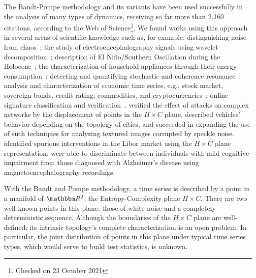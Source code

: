\documentclass[alpha-refs]{wiley-article}
\begin{document}
The Bandt-Pompe methodology and its variants have been used successfully in the analysis of many types of dynamics, receiving so far more than \num{2,160} citations, according to the Web of Science\footnote{Checked on 23 October 2021}.
We found works using this approach in several areas of scientific knowledge such as, for example:
%
distinguishing noise from chaos~\citep{rosso2007distinguishing};
%
the study of electroencephalography signals using wavelet decomposition~\citep{baravalle2018discriminating,baravalle2018rhythmic};
%
description of El Niño/Southern Oscillation during the Holocene~\citep{saco2010entropy};
%
the characterization of household appliances through their energy consumption~\citep{CharacterizationElectricLoadInformationTheoryQuantifiers};
%
detecting and quantifying stochastic and coherence resonance~\citep{rosso2009detectinga, rosso2009detectingb};
%
analysis and characterization of economic time series, e.g., stock market, sovereign bonds, credit rating, commodities, and cryptocurrencies~\citep{zunino2010complexity, zunino2012efficiency, bariviera2013efficiency, bariviera2018analysis, Araujo2019permutation};
%
online signature classification and verification~\citep{ClassificationVerificationOnlineHandwrittenSignatures}.
\cite{InformationTheoryPerspectiveNetworkRobustness} verified the effect of attacks on complex networks by the displacement of points in the $H \times C$ plane.
\citet{CharacterizationVehicleBehaviorInformationTheory} described vehicles' behavior depending on the topology of cities, and
\citet{Chagas2020Characterization} succeeded in expanding the use of such techniques for analyzing textured images corrupted by speckle noise.
\citet{LiborInvisibleHand} identified spurious interventions in the Libor market using the $H\times C$ plane representation.
\citet{echegoyen2020permutation} were able to discriminate between individuals with mild cognitive impairment from those diagnosed with Alzheimer's disease using magnetoencephalography recordings.

With the Bandt and Pompe methodology, a time series is described by a point in a manifold of $\mathbbm R^2$: the Entropy-Complexity plane $H\times C$.
There are two well-known points in this plane: those of white noise and a completely deterministic sequence.
Although the boundaries of the $H\times C$ plane are well-defined, its intrinsic topology's complete characterization is an open problem.
In particular, the joint distribution of points in this plane under typical time series types, which would serve to build test statistics, is unknown.
\end{document}
